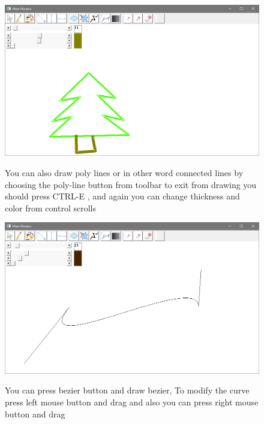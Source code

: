 \begin{figure}[h!]
  \centering
    {%
      \includegraphics[width=1\textwidth]{10}}
  \caption{You can also draw poly lines or in other word connected lines by choosing the poly-line button from toolbar to exit from drawing you should press CTRL-E , and again you can change thickness and color from control scrolls  }
\end{figure}

\begin{figure}[h!]
  \centering
    {%
      \includegraphics[width=1\textwidth]{11}}
  \caption{You can press bezier button and draw bezier, To modify the curve press left mouse button and drag and also you can press right mouse button and drag}
\end{figure}


